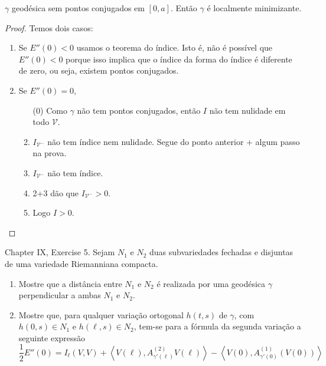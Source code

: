 \begin{exercise}
\label{exercise-geodesica-sem-pontos-conjugados-e-localmente-minimizante}
$\gamma$ geodésica sem pontos conjugados em $[0,a]$. Então $\gamma$ é localmente
minimizante.
\end{exercise}

\begin{proof}
Temos dois casos:
\begin{enumerate}
\item Se $E''(0)<0$ usamos o teorema do índice. Isto é, não é possível que
 $E''(0)<0$ porque isso implica que o índice da forma do índice é diferente
 de zero, ou seja, existem pontos conjugados.
\item Se $E''(0)=0$,
\begin{enumerate}
\item[(0)] Como $\gamma$ não tem pontos conjugados, então $I$ não tem
nulidade em todo  $\mathcal{V}$.
\item $I_{\mathcal{V}^-}$ não tem índice nem nulidade. Segue do ponto anterior + 
algum passo na prova.
\item $I_{\mathcal{V}^-}$ não tem índice.
\item 2+3 dão que $I_{\mathcal{V}^-}>0$.
\item Logo $I>0$.
\end{enumerate}
\end{enumerate}
\end{proof}

\begin{exercise}
\label{exercise-two-submanifolds}
\cite{doc} Chapter IX, Exercise 5. Sejam $N_1$ e $N_2$ duas subvariedades
 fechadas e disjuntas de uma variedade Riemanniana compacta.
\begin{enumerate}
\item Mostre que a distância entre $N_1$ e $N_2$ é realizada por uma geodésica
	$\gamma$ perpendicular a ambas $N_1$ e $N_2$.
\item Mostre que, para qualquer variação ortogonal $h(t,s)$ de $\gamma$, com
$h(0,s) \in N_1$ e $h(\ell,s) \in N_2$, tem-se para a fórmula da segunda
variação a seguinte expressão
$$
\frac{1}{2}E''(0)=I_{\ell}(V,V)+
\left<V(\ell),A_{\gamma'(\ell)}^{(2)}V(\ell)\right>
-\left<V(0),A^{(1)}_{\gamma'(0)}(V(0))\right>
$$
\end{enumerate}
\end{exercise}

